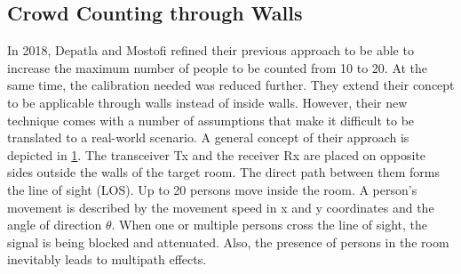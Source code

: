 \documentclass[conference]{IEEEtran}
\begin{document}
\subsection{Crowd Counting through Walls}
In 2018, Depatla and Mostofi \cite{DepatlaMostofi} refined their previous approach to be able to increase the maximum number of people to be counted from 10 to 20. At the same time, the calibration needed was reduced further. They extend their concept to be applicable through walls instead of inside walls. However, their new technique comes with a number of assumptions that make it difficult to be translated to a real-world scenario. A general concept of their approach is depicted in \ref{concept}. The transceiver Tx and the receiver Rx are placed on opposite sides outside the walls of the target room. The direct path between them forms the line of sight (LOS). Up to 20 persons move inside the room. A person's movement is described by the movement speed in x and y coordinates and the angle of direction $\theta$. When one or multiple persons cross the line of sight, the signal is being blocked and attenuated. Also, the presence of persons in the room inevitably leads to multipath effects. 
\begin{figure}
\label{concept}
\end{figure}
\end{document}
